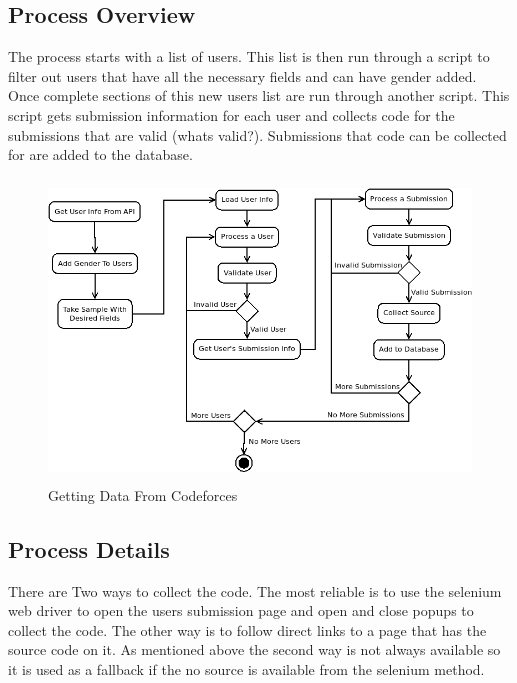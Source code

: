 \documentclass{article}
\begin{document}
\subsection{Process Overview}
The process starts with a list of users. This list is then run through a script to filter out users that have all the necessary fields and can have gender added. Once complete sections of this new users list are run through another script. This script gets submission information for each user and collects code for the submissions that are valid (whats valid?). Submissions that code can be collected for are added to the database.

\begin{figure}[!h]
    \centering
    \includegraphics[height=8cm]{diagrams/cf_process.png}
    \caption{Getting Data From Codeforces}
\end{figure}


\subsection{Process Details}
There are Two ways to collect the code. The most reliable is to use the selenium web driver to open the users submission page and open and close popups to collect the code. The other way is to follow direct links to a page that has the source code on it. As mentioned above the second way is not always available so it is used as a fallback if the no source is available from the selenium method.
\end{document}

